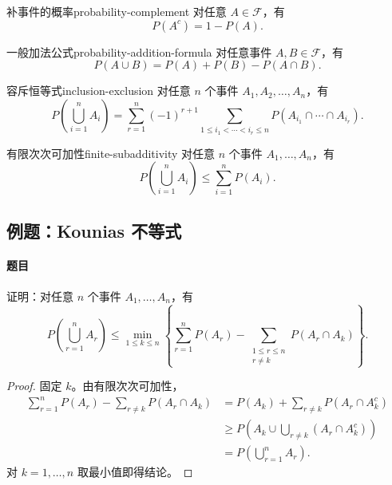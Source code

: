 \begin{proposition}{补事件的概率}{probability-complement}
对任意 $A\in\mathscr{F}$，有
\[
P(A^c)=1-P(A).
\]
\end{proposition}

\begin{proposition}{一般加法公式}{probability-addition-formula}
对任意事件 $A,B\in\mathscr{F}$，有
\[
P(A\cup B)=P(A)+P(B)-P(A\cap B).
\]
\end{proposition}

\begin{mytheorem}{容斥恒等式}{inclusion-exclusion}
对任意 $n$ 个事件 $A_1,A_2,\ldots,A_n$，有
\[
P\left(\bigcup_{i=1}^{n}A_i\right)
=\sum_{r=1}^{n}(-1)^{r+1}
\sum_{1\leq i_1<\cdots<i_r\leq n}
P\left(A_{i_1}\cap\cdots\cap A_{i_r}\right).
\]
\end{mytheorem}

\begin{mycorollary}{有限次次可加性}{finite-subadditivity}
对任意 $n$ 个事件 $A_1,\ldots,A_n$，有
\[
P\left(\bigcup_{i=1}^{n}A_i\right)
\leq\sum_{i=1}^{n}P(A_i).
\]
\end{mycorollary}

\subsection{例题：Kounias 不等式}\label{note:c1:e5}
\paragraph{题目}
证明：对任意 $n$ 个事件 $A_1,\ldots,A_n$，有
\[
P\left(\bigcup_{r=1}^{n}A_r\right)
\leq\min_{1\leq k\leq n}
\left\{
\sum_{r=1}^{n}P(A_r)-\sum_{\substack{1\leq r\leq n\\ r\ne k}}P(A_r\cap A_k)
\right\}.
\]

\begin{proof}
固定 $k$。由有限次次可加性，
\[
\begin{aligned}
\sum_{r=1}^{n}P(A_r)-\sum_{r\ne k}P(A_r\cap A_k)
&=P(A_k)+\sum_{r\ne k}P(A_r\cap A_k^c)\\
&\geq P\left(A_k\cup\bigcup_{r\ne k}(A_r\cap A_k^c)\right)\\
&=P\left(\bigcup_{r=1}^{n}A_r\right).
\end{aligned}
\]
对 $k=1,\ldots,n$ 取最小值即得结论。
\end{proof}

